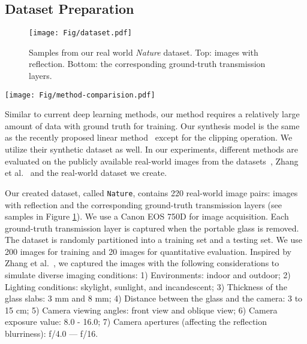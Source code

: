 \documentclass[10pt,twocolumn,letterpaper]{article}
\begin{document}
\subsection{Dataset Preparation}
\begin{figure}[h]
    \vspace{-1em}
    \begin{center}
        \texttt{[image: Fig/dataset.pdf]}
    \end{center}
    \vspace{-1em}
    \caption{Samples from our real world \textit{Nature} dataset. Top: images with reflection. Bottom: the corresponding ground-truth transmission layers.
    }
    \vspace{-0.5em}
    \label{fig:dataset}
\end{figure}


\begin{figure*}[htbp]
    \begin{center}
    \texttt{[image: Fig/method-comparision.pdf]}
    \end{center}
    \vspace{-1em}
    \caption{Visual comparison among state-of-the-art approaches and our method on images from three real-world image datasets, namely, \textit{Nature} (Rows 1-2),  (Rows 3-4) and Zhang et al. (Rows 5-6). More results can be found in the \textit{suppl. material}.
    }
    \vspace{-0.5em}
    \label{fig:method-comparision}
\end{figure*}


Similar to current deep learning methods, our method requires a relatively large amount of data with ground truth for training. Our synthesis model is the same as the recently proposed linear method~\cite{zhang2018single} except for the clipping operation. We utilize their synthetic dataset as well. In our experiments, different methods are evaluated on the publicly available real-world images from the  datasets~\cite{wan2017benchmarking}, Zhang et al.~\cite{zhang2018single} and the real-world dataset we create. 

Our created dataset, called \texttt{Nature}, contains 220 real-world image pairs: images with reflection and the corresponding ground-truth transmission layers (see samples in Figure \ref{fig:dataset}). We use a Canon EOS 750D for image acquisition. Each ground-truth transmission layer is captured when the portable glass is removed. The dataset is randomly partitioned into a training set and a testing set. We use 200 images for training and 20 images for quantitative evaluation. Inspired by Zhang et al.~\cite{zhang2018single}, we captured the images with the following considerations to simulate diverse imaging conditions: 1) Environments: indoor and outdoor; 2) Lighting conditions: skylight, sunlight, and incandescent; 3) Thickness of the glass slabs: 3 mm and 8 mm; 4) Distance between the glass and the camera: 3 to 15 cm; 5) Camera viewing angles: front view and oblique view; 6) Camera exposure value: 8.0 - 16.0; 7) Camera apertures (affecting the reflection blurriness): f/4.0 — f/16.
\end{document}
